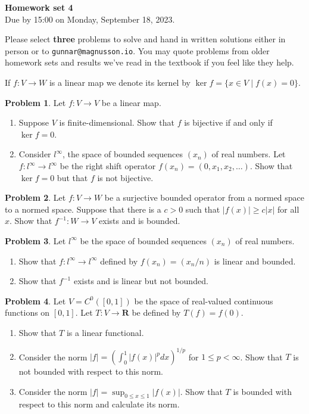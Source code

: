 \documentclass[11pt]{article}
\theoremstyle{definition}
\newtheorem{prob}{Problem}
\newcommand{\kk}[1]{\mathbf{#1}}
\def\head{
\begin{center}
\textbf{\LARGE Homework set 4}
\\[3pt]
Due by 15:00 on Monday, September 18, 2023.
\end{center}
\medskip
}
\begin{document}
\head

Please select \textbf{three} problems to solve and hand in written solutions
either in person or to \verb+gunnar@magnusson.io+. You may quote problems from
older homework sets and results we've read in the textbook if you feel like
they help.

If $f : V \to W$ is a linear map we denote its kernel by $\ker f = \{ x \in V
\mid f(x) = 0 \}$.

\begin{prob}
Let $f : V \to V$ be a linear map.
\begin{enumerate}
\item
Suppose $V$ is finite-dimensional.
Show that $f$ is bijective if and only if $\ker f = 0$.

\item
Consider $l^\infty$, the space of bounded sequences $(x_n)$ of real
numbers.
Let $f : l^\infty \to l^\infty$ be the right shift operator $f(x_n) =
(0,x_1,x_2,\ldots)$.
Show that $\ker f = 0$ but that $f$ is not bijective.
\end{enumerate}
\end{prob}

\begin{prob}
Let $f : V \to W$ be a surjective bounded operator from a normed space to a
normed space. Suppose that there is a $c > 0$ such that $|f(x)| \geq c|x|$ for
all $x$. Show that $f^{-1} : W \to V$ exists and is bounded.
\end{prob}

\begin{prob}
Let $l^\infty$ be the space of bounded sequences $(x_n)$ of real numbers.
\begin{enumerate}
\item
Show that $f : l^\infty \to l^\infty$ defined by $f(x_n) = (x_n / n)$ is linear
and bounded.

\item
Show that $f^{-1}$ exists and is linear but not bounded.
\end{enumerate}
\end{prob}

\begin{prob}
Let $V = C^0([0,1])$ be the space of real-valued continuous functions on $[0,1]$.
Let $T : V \to \kk R$ be defined by $T(f) = f(0)$.
\begin{enumerate}
\item
Show that $T$ is a linear functional.

\item
Consider the norm $|f| = (\int_0^1 |f(x)|^p dx)^{1/p}$ for $1 \leq p < \infty$.
Show that $T$ is not bounded with respect to this norm.

\item
Consider the norm $|f| = \sup_{0 \leq x \leq 1} |f(x)|$.
Show that $T$ is bounded with respect to this norm and calculate its norm.
\end{enumerate}
\end{prob}
\end{document}
